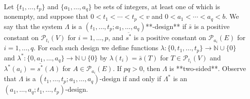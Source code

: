 Let $\{t_1, \ldots, t_p\}$ and $\{a_1, \ldots, a_q\}$ be sets of integers, at least one of which is nonempty, and suppose that $0 < t_1 < \cdots < t_p < v$ and $0 < a_1 < \cdots < a_q < b$. We say that the system $\Lambda$ is a $(t_1, \ldots, t_p; a_1, \ldots, a_q)$**-design** if $\bar{s}$ is a positive constant on $\mathcal{P}_{t_i}(V)$ for $i = 1, \ldots, p$, and $\overline{s^*}$ is a positive constant on $\mathcal{P}_{a_i}(E)$ for $i = 1, \ldots, q$. For each such design we define functions $\lambda: \{0, t_1, \ldots, t_p\} \to \mathbb{N} \cup \{0\}$ and $\lambda^*: \{0, a_1, \ldots, a_q\} \to \mathbb{N} \cup \{0\}$ by $\lambda(t_i) = \bar{s}(T)$ for $T \in \mathcal{P}_{t_i}(V)$ and $\lambda^*(a_i) = \overline{s^*}(A)$ for $A \in \mathcal{P}_{a_i}(E)$. If $pq > 0$, then $\Lambda$ is **two-sided**. Observe that $\Lambda$ is a $(t_1, \ldots, t_p; a_1, \ldots, a_q)$-design if and only if $\Lambda^*$ is an $(a_1, \ldots, a_q; t_1, \ldots, t_p)$-design.
